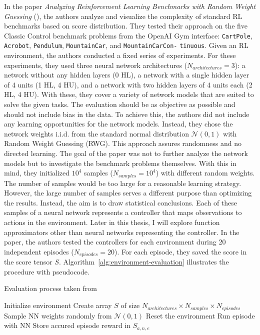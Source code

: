 In the paper \emph{Analyzing Reinforcement Learning Benchmarks with Random Weight Guessing} (\citet{oller_analyzing_2020}), the authors analyze and visualize the complexity of standard RL benchmarks based on score distribution. They tested their approach on the five Classic Control benchmark problems from the OpenAI Gym interface: \verb|CartPole|, \verb|Acrobot|, \verb|Pendulum|, \verb|MountainCar|, and \verb|MountainCarCon-| \verb|tinuous|. Given an RL environment, the authors conducted a fixed series of experiments. For these experiments, they used three neural network architectures ($N_{architectures}=3$): a network without any hidden layers (0 HL), a network with a single hidden layer of 4 units (1 HL, 4 HU), and a network with two hidden layers of 4 units each (2 HL, 4 HU). With these, they cover a variety of network models that are suited to solve the given tasks. The evaluation should be as objective as possible and should not include bias in the data. To achieve this, the authors did not include any learning opportunities for the network models. Instead, they chose the network weights i.i.d. from the standard normal distribution $\mathcal{N}(0,1)$ with Random Weight Guessing (RWG). This approach assures randomness and no directed learning. The goal of the paper was not to further analyze the network models but to investigate the benchmark problems themselves. With this in mind, they initialized $10^4$ samples ($N_{samples}=10^4$) with different random weights. The number of samples would be too large for a reasonable learning strategy. However, the large number of samples serves a different purpose than optimizing the results. Instead, the aim is to draw statistical conclusions. Each of these samples of a neural network represents a controller that maps observations to actions in the environment. Later in this thesis, I will explore function approximators other than neural networks representing the controller. In the paper, the authors tested the controllers for each environment during 20 independent episodes ($N_{episodes}=20$). For each episode, they saved the score in the score tensor $S$. Algorithm~\ref{alg:environment-evaluation} illustrates the procedure with pseudocode.

\begin{algorithm}
\caption{Evaluation process taken from \citet{oller_analyzing_2020}}
\begin{algorithmic}[1]
\State Initialize environment
\State Create array $S$ of size $N_{architectures} \times N_{samples} \times N_{episodes}$
    \State Sample NN weights randomly from $\mathcal{N}(0,1)$
      \State Reset the environment
      \State Run episode with NN
      \State Store accured episode reward in $S_{a,n,e}$
    \EndFor
\EndFor
\end{algorithmic}
\label{alg:environment-evaluation}
\end{algorithm}

